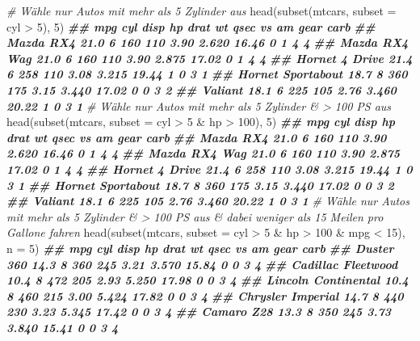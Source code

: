 \documentclass[
]{article}
\newenvironment{Shaded}{\begin{snugshade}}{\end{snugshade}}
\newcommand{\AttributeTok}[1]{\textcolor[rgb]{0.77,0.63,0.00}{#1}}
\newcommand{\CommentTok}[1]{\textcolor[rgb]{0.56,0.35,0.01}{\textit{#1}}}
\newcommand{\DecValTok}[1]{\textcolor[rgb]{0.00,0.00,0.81}{#1}}
\newcommand{\DocumentationTok}[1]{\textcolor[rgb]{0.56,0.35,0.01}{\textbf{\textit{#1}}}}
\newcommand{\FunctionTok}[1]{\textcolor[rgb]{0.00,0.00,0.00}{#1}}
\newcommand{\NormalTok}[1]{#1}
\newcommand{\SpecialCharTok}[1]{\textcolor[rgb]{0.00,0.00,0.00}{#1}}
\begin{document}
\begin{Shaded}
\begin{Highlighting}[]
\CommentTok{\# Wähle nur Autos mit mehr als 5 Zylinder aus}
\FunctionTok{head}\NormalTok{(}\FunctionTok{subset}\NormalTok{(mtcars,}
       \AttributeTok{subset =}\NormalTok{ cyl }\SpecialCharTok{\textgreater{}} \DecValTok{5}\NormalTok{), }\DecValTok{5}\NormalTok{)}
\DocumentationTok{\#\#                    mpg cyl disp  hp drat    wt  qsec vs am gear carb}
\DocumentationTok{\#\# Mazda RX4         21.0   6  160 110 3.90 2.620 16.46  0  1    4    4}
\DocumentationTok{\#\# Mazda RX4 Wag     21.0   6  160 110 3.90 2.875 17.02  0  1    4    4}
\DocumentationTok{\#\# Hornet 4 Drive    21.4   6  258 110 3.08 3.215 19.44  1  0    3    1}
\DocumentationTok{\#\# Hornet Sportabout 18.7   8  360 175 3.15 3.440 17.02  0  0    3    2}
\DocumentationTok{\#\# Valiant           18.1   6  225 105 2.76 3.460 20.22  1  0    3    1}
\CommentTok{\# Wähle nur Autos mit mehr als 5 Zylinder \& \textgreater{} 100 PS aus}
\FunctionTok{head}\NormalTok{(}\FunctionTok{subset}\NormalTok{(mtcars,}
       \AttributeTok{subset =}\NormalTok{ cyl }\SpecialCharTok{\textgreater{}} \DecValTok{5} \SpecialCharTok{\&}
\NormalTok{                hp }\SpecialCharTok{\textgreater{}} \DecValTok{100}\NormalTok{), }\DecValTok{5}\NormalTok{) }
\DocumentationTok{\#\#                    mpg cyl disp  hp drat    wt  qsec vs am gear carb}
\DocumentationTok{\#\# Mazda RX4         21.0   6  160 110 3.90 2.620 16.46  0  1    4    4}
\DocumentationTok{\#\# Mazda RX4 Wag     21.0   6  160 110 3.90 2.875 17.02  0  1    4    4}
\DocumentationTok{\#\# Hornet 4 Drive    21.4   6  258 110 3.08 3.215 19.44  1  0    3    1}
\DocumentationTok{\#\# Hornet Sportabout 18.7   8  360 175 3.15 3.440 17.02  0  0    3    2}
\DocumentationTok{\#\# Valiant           18.1   6  225 105 2.76 3.460 20.22  1  0    3    1}
\CommentTok{\# Wähle nur Autos mit mehr als 5 Zylinder \& \textgreater{} 100 PS aus \& dabei weniger als 15 Meilen pro Gallone fahren}
\FunctionTok{head}\NormalTok{(}\FunctionTok{subset}\NormalTok{(mtcars,}
       \AttributeTok{subset =}\NormalTok{ cyl }\SpecialCharTok{\textgreater{}} \DecValTok{5} \SpecialCharTok{\&}
\NormalTok{                hp }\SpecialCharTok{\textgreater{}} \DecValTok{100} \SpecialCharTok{\&}
\NormalTok{                mpg }\SpecialCharTok{\textless{}} \DecValTok{15}\NormalTok{), }\AttributeTok{n =} \DecValTok{5}\NormalTok{)}
\DocumentationTok{\#\#                      mpg cyl disp  hp drat    wt  qsec vs am gear carb}
\DocumentationTok{\#\# Duster 360          14.3   8  360 245 3.21 3.570 15.84  0  0    3    4}
\DocumentationTok{\#\# Cadillac Fleetwood  10.4   8  472 205 2.93 5.250 17.98  0  0    3    4}
\DocumentationTok{\#\# Lincoln Continental 10.4   8  460 215 3.00 5.424 17.82  0  0    3    4}
\DocumentationTok{\#\# Chrysler Imperial   14.7   8  440 230 3.23 5.345 17.42  0  0    3    4}
\DocumentationTok{\#\# Camaro Z28          13.3   8  350 245 3.73 3.840 15.41  0  0    3    4}
\end{Highlighting}
\end{Shaded}
\end{document}
